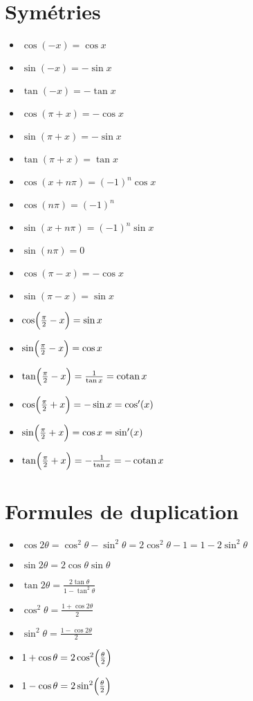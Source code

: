 \documentclass{yann}
\begin{document}
\section{Symétries}

\begin{itemize}
\item
$\cos(-x)          = \cos x$
\item
$\sin(-x)          = -\sin x$
\item
$\tan(-x)          = -\tan x$
\item
$\cos(\pi+x)         = -\cos x$
\item
$\sin(\pi+x)         = -\sin x$
\item
$\tan(\pi+x)         = \tan x$
\item
$\cos(x+n\pi)        = (-1)^n \cos x$
\item
$\cos(n\pi)          = (-1)^n$
\item
$\sin(x+n\pi)        = (-1)^n \sin x$
\item
$\sin(n\pi)          = 0$
\item
$\cos(\pi-x)         = -\cos x$
\item
$\sin(\pi-x)         = \sin x$
\item
$\cos\Bigl({\frac\pi2 - x}\Bigr) = \sin x$
\item
$\sin\Bigl({\frac\pi2 - x}\Bigr) = \cos x$
\item
$\tan\Bigl({\frac\pi2 - x}\Bigr) = \frac{1}{\tan x} = \operatorname{cotan} x$
\item
$\cos\Bigl({\frac\pi2 + x}\Bigr) = -\sin x = \cos'(x)$
\item
$\sin\Bigl({\frac\pi2 + x}\Bigr) = \cos x = \sin'(x)$
\item
$\tan\Bigl({\frac\pi2 + x}\Bigr) = -\frac{1}{\tan x} = -\operatorname{cotan} x$
\end{itemize}

\section{Formules de duplication}

\begin{itemize}
\item
$\cos 2\theta= \cos^2\theta- \sin^2\theta= 2\cos^2\theta- 1 = 1 - 2\sin^2\theta$
\item
$\sin 2\theta= 2 \cos\theta\sin\theta$
\item
$\tan 2\theta= \frac{2\tan\theta}{1-\tan^2\theta}$
\item
$\cos^2\theta= \frac{1+\cos 2\theta}{2}$
\item
$\sin^2\theta= \frac{1-\cos 2\theta}{2}$
\item
$1 + \cos\theta= 2 \cos^2 \Bigl({\frac{\theta}{2}}\Bigr)$
\item
$1 - \cos\theta= 2 \sin^2 \Bigl({\frac{\theta}{2}}\Bigr)$
\end{itemize}
\end{document}
